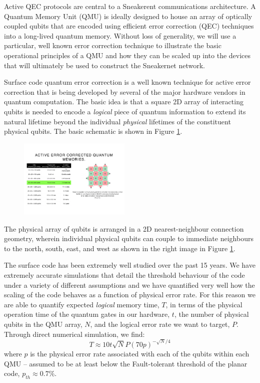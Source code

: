 \documentclass[twocolumn, aps, rmp, amsmath, amssymb, nofootinbib, superscriptaddress, longbibliography, floatfix, table-of-contents, eqsecnum]{revtex4-2}
\begin{document}
Active QEC protocols are central to a Sneakerent communications architecture. A Quantum Memory Unit (QMU) is ideally designed to house an array of optically coupled qubits that are encoded using efficient error correction (QEC) techniques into a long-lived quantum memory. Without loss of generality, we will use a particular, well known error correction technique to illustrate the basic operational principles of a QMU and how they can be scaled up into the devices that will ultimately be used to construct the Sneakernet network.

Surface code quantum error correction is a well known technique for active error correction that is being developed by several of the major hardware vendors in quantum computation. The basic idea is that a square 2D array of interacting qubits is needed to encode a \textit{logical} piece of quantum information to extend its natural lifetime beyond the individual \textit{physical} lifetimes of the constituent physical qubits. The basic schematic is shown in Figure \ref{fig:array}. 

\begin{figure}[htbp!]
	\includegraphics[clip=true, width=0.475\textwidth]{array}
	\caption{}
	\label{fig:array}
\end{figure}

The physical array of qubits is arranged in a 2D nearest-neighbour connection geometry, wherein individual physical qubits can couple to immediate neighbours to the north, south, east, and west as shown in the right image in Figure \ref{fig:array}. 

The surface code has been extremely well studied over the past 15 years. We have extremely accurate simulations that detail the threshold behaviour of the code under a variety of different assumptions and we have quantified very well how the scaling of the code behaves as a function of physical error rate. For this reason we are able to quantify expected \textit{logical} memory time, $T$, in terms of the physical operation time of the quantum gates in our hardware, $t$, the number of physical qubits in the QMU array, $N$, and the logical error rate we want to target, $P$. Through direct numerical simulation, we find:
\begin{equation}
T \approx 10t\sqrt{N} P(70p)^{-\sqrt{N}/4}
\label{eq:scale}
\end{equation}
where $p$ is the physical error rate associated with each of the qubits within each QMU -- assumed to be at least below the Fault-tolerant threshold of the planar code, $p_{th} \approx 0.7\%$.
\end{document}

